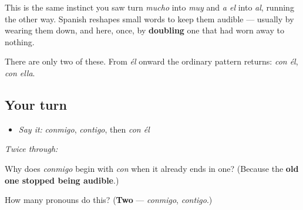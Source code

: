 \begin{culture}
This is the same instinct you saw turn \emph{mucho} into \emph{muy} and \emph{a el} into \emph{al}, running the other way. Spanish reshapes small words to keep them audible — usually by wearing them down, and here, once, by \textbf{doubling} one that had worn away to nothing.

There are only two of these. From \emph{él} onward the ordinary pattern returns: \emph{con él}, \emph{con ella}.
\end{culture}

\subsection*{Your turn}
\begin{itemize}
\raggedright
  \item \emph{Say it:} \emph{conmigo}, \emph{contigo}, then \emph{con él}
\end{itemize}

\emph{Twice through:}

\begin{tcolorbox}[breakable,colback=teal!4,colframe=teal!35!black,title={Before you move on}]
Why does \emph{conmigo} begin with \emph{con} when it already ends in one? (Because the \textbf{old one stopped being audible}.)

How many pronouns do this? (\textbf{Two} — \emph{conmigo}, \emph{contigo}.)
\end{tcolorbox}
